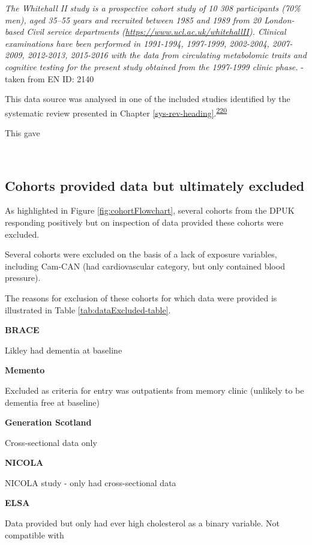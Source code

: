 \documentclass[a4paper, twoside]{templates/ociamthesis}
\begin{document}
\emph{The Whitehall II study is a prospective cohort study of 10 308 participants (70\% men), aged 35--55 years and recruited between 1985 and 1989 from 20 London-based Civil service departments (\url{https://www.ucl.ac.uk/whitehallII}). Clinical examinations have been performed in 1991-1994, 1997-1999, 2002-2004, 2007-2009, 2012-2013, 2015-2016 with the data from circulating metabolomic traits and cognitive testing for the present study obtained from the 1997-1999 clinic phase.} - taken from EN ID: 2140

This data source was analysed in one of the included studies identified by the systematic review presented in Chapter \ref{sys-rev-heading}.\textsuperscript{\protect\hyperlink{ref-tynkkynen2018}{220}}

This gave

~

\hypertarget{cohorts-provided-data-but-ultimately-excluded}{%
\subsection{Cohorts provided data but ultimately excluded}\label{cohorts-provided-data-but-ultimately-excluded}}

As highlighted in Figure \ref{fig:cohortFlowchart}, several cohorts from the DPUK responding positively but on inspection of data provided these cohorts were excluded.

Several cohorts were excluded on the basis of a lack of exposure variables, including Cam-CAN (had cardiovascular category, but only contained blood pressure).

The reasons for exclusion of these cohorts for which data were provided is illustrated in Table \ref{tab:dataExcluded-table}.

\textbf{BRACE}

Likley had dementia at baseline

\textbf{Memento}

Excluded as criteria for entry was outpatients from memory clinic (unlikely to be dementia free at baseline)

\textbf{Generation Scotland}

Cross-sectional data only

\textbf{NICOLA}

NICOLA study - only had cross-sectional data

\textbf{ELSA}

Data provided but only had ever high cholesterol as a binary variable. Not compatible with
\end{document}
